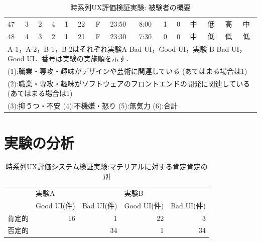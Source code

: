 \begin{table}[htbp]
{\begin{tabular}{lllllllllllllll}
47                  & 3                      & 2                       & 4                      & 1                       & 22                     & F                   & 23:50                 & 8:00                  & 1                    & 0                    & 中       & 低       & 高    & 中  \\
48                  & 4                      & 3                       & 2                      & 1                       & 21                     & F                   & 23:30                 & 7:30                  & 0                    & 0                    & 中       & 低       & 低    & 低  \\ \hline
\multicolumn{15}{l}{A-1，A-2，B-1，B-2はそれぞれ実験A Bad UI，Good UI，実験 B Bad UI，Good UI．番号は実験の実施順を示す．}\\
\multicolumn{15}{l}{(1):職業・専攻・趣味がデザインや芸術に関連している (あてはまる場合は1)}\\
\multicolumn{15}{l}{(2):職業・専攻・趣味がソフトウェアのフロントエンドの開発に関連している(あてはまる場合は1)}\\
\multicolumn{15}{l}{(3):抑うつ・不安 (4):不機嫌・怒り (5):無気力 (6):合計}\\
\end{tabular}
}
\caption{時系列UX評価検証実験: 被験者の概要}
\label{table:exp2result1}
\end{table}


\section{実験の分析}

\begin{table}[htbp]
\centering
\begin{tabular}{llrlr}
\hline
    & \multicolumn{2}{l}{実験A}                             & \multicolumn{2}{l}{実験B}                             \\ \cline{2-5} 
    & Good UI(件)                & \multicolumn{1}{l}{Bad UI(件)} & Good UI(件)                & \multicolumn{1}{l}{Bad UI(件)} \\ \hline
肯定的 & \multicolumn{1}{r}{16} & 1                          & \multicolumn{1}{r}{22} & 3                          \\
否定的 & \multicolumn{1}{r}{}   & 34                         & \multicolumn{1}{r}{1}  & 34                         \\ \hline
\end{tabular}
\caption{時系列UX評価システム検証実験:マテリアルに対する肯定肯定の別}
\label{table:negaposi}
\end{table}

